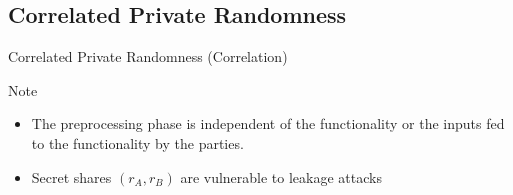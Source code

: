 \subsection{Correlated Private Randomness}
\begin{frame}{Correlated Private Randomness (Correlation)}

	{
	\begin{block}{Note}
	\begin{itemize}
		\item  The preprocessing phase is independent of the functionality or the inputs fed to the functionality by the parties.
		\item Secret shares $(r_A, r_B)  $ are vulnerable to leakage attacks
	\end{itemize}
	\end{block}}

		
\end{frame}


%	
		
